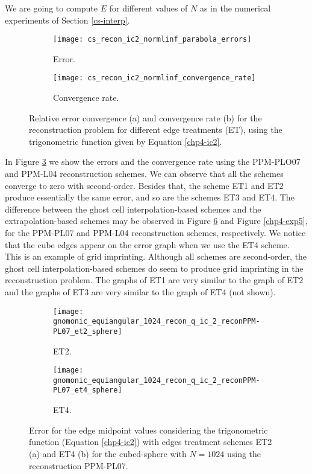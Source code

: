 We are going to compute $E$ for different values of $N$ as in the numerical experiments of Section \ref{cs-interp}.
\begin{figure}[!htb]
	\centering
	\begin{subfigure}{0.45\textwidth}
		\centering
		\texttt{[image: cs\_recon\_ic2\_normlinf\_parabola\_errors]}
		\caption{Error.\label{chp4-exp3-error}}
	\end{subfigure}
	\begin{subfigure}{0.45\textwidth}
		\centering
		\texttt{[image: cs\_recon\_ic2\_normlinf\_convergence\_rate]}
		\caption{Convergence rate.\label{chp4-exp3-CR}}
	\end{subfigure}
	\caption{Relative error convergence (a) and convergence rate (b) for the reconstruction problem for different
	edge treatments (ET), using the trigonometric function given by Equation \eqref{chp4-ic2}.\label{chp4-exp3}}
\end{figure}

In Figure \ref{chp4-exp3} we show the errors and the convergence rate using the PPM-PLO07 and PPM-L04 reconstruction schemes.
We can observe that all the schemes converge to zero with second-order.
Besides that, the scheme ET1 and ET2 produce essentially the same error, and so are the schemes ET3 and ET4.
The difference between the ghost cell interpolation-based schemes and the extrapolation-based schemes
may be observed in Figure \ref{chp4-exp4} and Figure \ref{chp4-exp5}, for the  PPM-PL07 and PPM-L04 reconstruction schemes,
respectively.
We notice that the cube edges appear on the error graph when we use the ET4 scheme. This is an example of grid imprinting.
Although all schemes are second-order, the ghost cell interpolation-based schemes do seem to produce grid imprinting
in the reconstruction problem.
The graphs of ET1 are very similar to the graph of ET2 and the graphs of ET3 are very similar to the graph of ET4 (not shown).
\newpage
\begin{figure}[!htb]
	\centering
	\begin{subfigure}{0.49\textwidth}
		\centering
		\texttt{[image: gnomonic\_equiangular\_1024\_recon\_q\_ic\_2\_reconPPM-PL07\_et2\_sphere]}
		\caption{ET2.\label{chp4-exp4-a}}
	\end{subfigure}
	\begin{subfigure}{0.49\textwidth}
		\centering
		\texttt{[image: gnomonic\_equiangular\_1024\_recon\_q\_ic\_2\_reconPPM-PL07\_et4\_sphere]}
		\caption{ET4.\label{chp4-exp4-b}}
	\end{subfigure}
	\caption{Error for the edge midpoint values considering the trigonometric function (Equation \eqref{chp4-ic2})
		with edges treatment schemes ET2 (a) and ET4 (b) for the cubed-sphere with $N=1024$ using the reconstruction PPM-PL07.\label{chp4-exp4}}
\end{figure}

